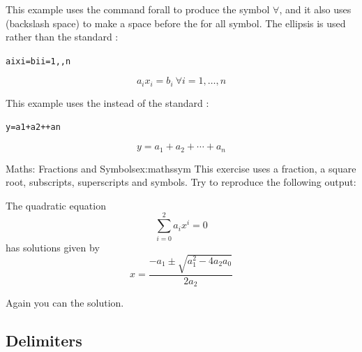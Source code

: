 
This example uses the command 
\label{cmd:forall}\gls{forall} to produce
the  symbol $\forall$, and it also uses 
 (backslash space) to make a space before the for all symbol. The
  ellipsis  is used rather
than the standard :
\begin{code}
\begin{alltt}
aixi = bi i = 1,, n
\end{alltt}
\end{code}%
\begin{resultS}
\[
a_ix_i = b_i\ \forall i = 1,\dotsc, n
\]
\end{resultS}


This example uses the  
 instead of the standard :
\begin{code}
\begin{alltt}
y = a1 + a2 +  + an 
\end{alltt}
\end{code}%
\begin{resultS}
\[
y = a_1 + a_2 + \dotsb + a_n 
\]
\end{resultS}

\begin{exercise}{Maths: Fractions and Symbols}{ex:mathssym}
This exercise uses a fraction, a square root, subscripts, 
superscripts and symbols.
Try to reproduce the following output:
\begin{result}
The quadratic equation
\[
\sum_{i=0}^{2} a_i x^i = 0
\]
has solutions given by
\[
x = \frac{-a_1 \pm \sqrt{a_1^2 - 4 a_2 a_0}}{2a_2}
\]
\end{result}%
Again you can  the solution.
\end{exercise}


\subsection{Delimiters}
\label{sec:delimiters}

